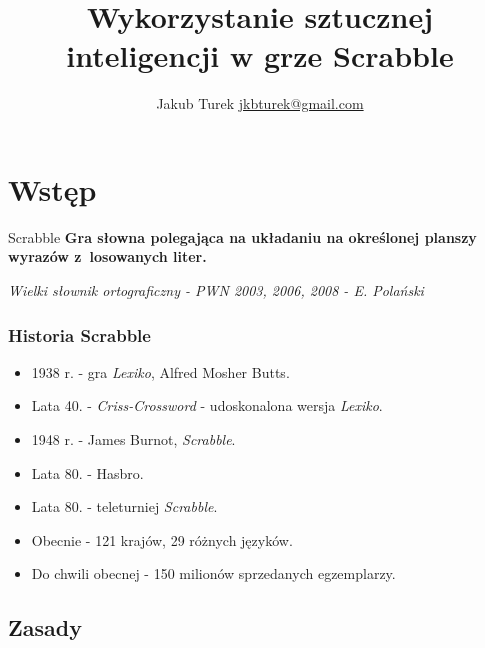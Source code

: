 \documentclass[10pt,a4paper]{beamer}
\author{\texorpdfstring{Jakub Turek \newline \href{mailto:jkbturek@gmail.com}{ jkbturek@gmail.com }}{Jakub Turek}}
\title{Wykorzystanie sztucznej inteligencji w grze Scrabble}
\institute{Wydział Elektroniki i Technik Informacyjnych}
\begin{document}
\begin{frame}
	\titlepage
\end{frame}

\section{Wstęp}

\begin{frame}
	\begin{block}{Scrabble}
		\textbf{Gra słowna polegająca na układaniu na określonej planszy wyrazów z~losowanych liter.}
		
		\vspace{10mm}
		
		\emph{Wielki słownik ortograficzny - PWN 2003, 2006, 2008 - E. Polański}
	\end{block}
\end{frame}

\begin{frame}
	\frametitle{Historia Scrabble}
	
	\begin{itemize}
		\item 1938 r. - gra \emph{Lexiko}, Alfred Mosher Butts.
		\item Lata 40. - \emph{Criss-Crossword} - udoskonalona wersja \emph{Lexiko}.
		\item 1948 r. - James Burnot, \emph{Scrabble}.
		\item Lata 80. - Hasbro.
		\item Lata 80. - teleturniej \emph{Scrabble}.
		\item Obecnie - 121 krajów, 29 różnych języków.
		\item Do chwili obecnej - 150 milionów sprzedanych egzemplarzy.
	\end{itemize}
\end{frame}

\subsection{Zasady}
\end{document}

